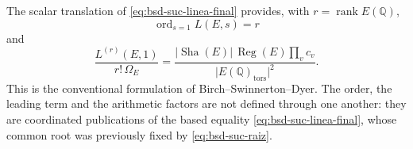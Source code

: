 The scalar translation of \eqref{eq:bsd-suc-linea-final} provides, with
\(r=\operatorname{rank}E(\mathbb Q)\),
\begin{equation}\label{eq:bsd-suc-rango-final}
 \operatorname{ord}_{s=1}L(E,s)=r
\end{equation}
and
\begin{equation}\label{eq:bsd-suc-formula-final}
 \frac{L^{(r)}(E,1)}{r!\,\Omega_E}
 =\frac{
   \lvert\operatorname{Sha}(E)\rvert\,\operatorname{Reg}(E)\prod_v c_v}
  {\lvert E(\mathbb Q)_{\mathrm{tors}}\rvert^2}.
\end{equation}
This is the conventional formulation of Birch--Swinnerton--Dyer. The order,
the leading term and the arithmetic factors are not defined through one
another: they are coordinated publications of the based equality
\eqref{eq:bsd-suc-linea-final}, whose common root was previously fixed by
\eqref{eq:bsd-suc-raiz}.

